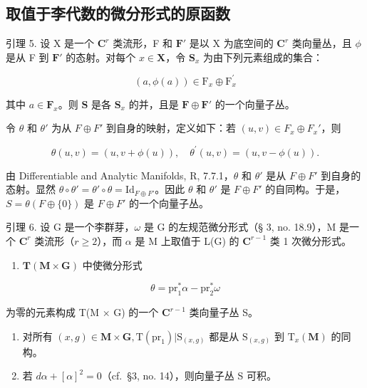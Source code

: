 \subsection{取值于李代数的微分形式的原函数}

引理 5. 设 X 是一个 \(\mathbf{C}^r\) 类流形，F 和 \(\mathbf{F}'\) 是以 X 为底空间的 \(\mathbf{C}^r\) 类向量丛，且 \(\phi\) 是从 F 到 \(\mathbf{F}'\) 的态射。对每个 \(x \in \mathbf{X}\)，令 \(\mathbf{S}_x\) 为由下列元素组成的集合：

\[
(a, \phi (a)) \in \mathrm{F} _ {x} \oplus \mathrm{F} _ {x} ^ {\prime}
\]

其中 \(a \in \mathbf{F}_x\)。则 \(\mathbf{S}\) 是各 \(\mathbf{S}_x\) 的并，且是 \(\mathbf{F} \oplus \mathbf{F}'\) 的一个向量子丛。

令 \(\theta\) 和 \(\theta'\) 为从 \(F \oplus F'\) 到自身的映射，定义如下：若 \((u, v) \in F_x \oplus F_x'\)，则

\[
\theta (u, v) = (u, v + \phi (u)), \quad \theta^ {\prime} (u, v) = (u, v - \phi (u)).
\]

由 Differentiable and Analytic Manifolds, R, 7.7.1，\(\theta\) 和 \(\theta'\) 是从 \(F \oplus F'\) 到自身的态射。显然 \(\theta \circ \theta' = \theta' \circ \theta = \mathrm{Id}_{F\oplus F'}\)。因此 \(\theta\) 和 \(\theta'\) 是 \(F \oplus F'\) 的自同构。于是，\(S = \theta(F \oplus \{0\})\) 是 \(F \oplus F'\) 的一个向量子丛。

引理 6. 设 G 是一个李群芽，\(\omega\) 是 G 的左规范微分形式（§ 3, no. 18.9），M 是一个 \(\mathbf{C}^r\) 类流形（\(r \geqslant 2\)），而 \(\alpha\) 是 M 上取值于 L(G) 的 \(\mathbf{C}^{r-1}\) 类 1 次微分形式。

\begin{enumerate}
\def\labelenumi{(\roman{enumi})}
\tightlist
\item
  \(\mathbf{T}(\mathbf{M}\times \mathbf{G})\) 中使微分形式
\end{enumerate}

\[
\theta = \mathrm{pr} _ {1} ^ {*} \alpha - \mathrm{pr} _ {2} ^ {*} \omega
\]

为零的元素构成 T(M × G) 的一个 \(\mathbf{C}^{r-1}\) 类向量子丛 S。

\begin{enumerate}
\def\labelenumi{(\roman{enumi})}
\setcounter{enumi}{1}
\item
  对所有 \((x,g)\in \mathbf{M}\times \mathbf{G},\mathrm{T}(\mathrm{pr}_1)|\mathrm{S}_{(x,g)}\) 都是从 \(\mathrm{S}_{(x,g)}\) 到 \(\mathrm{T}_x(\mathbf{M})\) 的同构。
\item
  若 \(d\alpha + [\alpha]^2 = 0\)（cf.~§3, no. 14），则向量子丛 S 可积。
\end{enumerate}

